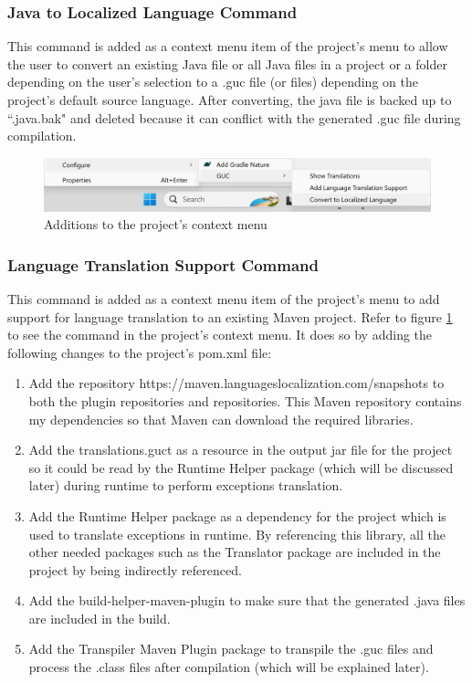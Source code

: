\subsubsection{Java to Localized Language Command}
This command is added as a context menu item of the project's menu to allow the user to convert an existing Java file or all Java files in a project or a folder depending on the user's selection to a .guc file (or files) depending on the project's default source language. After converting, the java file is backed up to ``.java.bak" and deleted because it can conflict with the generated .guc file during compilation. 

\begin{figure}[H]
\centering
\includegraphics[width=15cm]{ch3-images/eclipsecontextmenu.png}
\caption{Additions to the project's context menu}
\label{fig:Additions to the project's context menu}
\end{figure} 

\subsubsection{Language Translation Support Command}
This command is added as a context menu item of the project's menu to add support for language translation to an existing Maven project. Refer to figure \ref{fig:Additions to the project's context menu} to see the command in the project's context menu. It does so by adding the following changes to the project's pom.xml file:

\begin{enumerate}
    \item Add the repository https://maven.languageslocalization.com/snapshots to both the plugin repositories and repositories. This Maven repository contains my dependencies so that Maven can download the required libraries.
    \item Add the translations.guct as a resource in the output jar file for the project so it could be read by the Runtime Helper package (which will be discussed later) during runtime to perform exceptions translation.
    \item Add the Runtime Helper package as a dependency for the project which is used to translate exceptions in runtime. By referencing this library, all the other needed packages such as the Translator package are included in the project by being indirectly referenced.
    \item Add the build-helper-maven-plugin to make sure that the generated .java files are included in the build.
    \item Add the Transpiler Maven Plugin package to transpile the .guc files and process the .class files after compilation (which will be explained later).
\end{enumerate}

